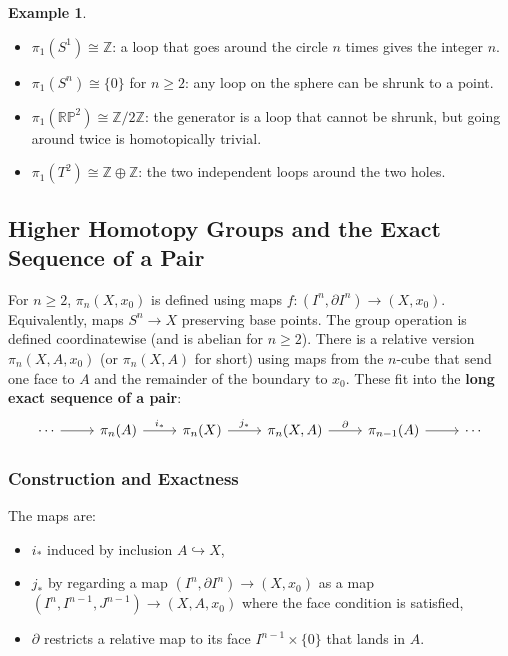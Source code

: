 \documentclass{article}
\theoremstyle{definition}
\newtheorem{example}{Example}[section]
\begin{document}
\begin{example}
\begin{itemize}
    \item $\pi_1(S^1) \cong \mathbb{Z}$: a loop that goes around the circle $n$ times gives the integer $n$.
    \item $\pi_1(S^n) \cong \{0\}$ for $n\ge 2$: any loop on the sphere can be shrunk to a point.
    \item $\pi_1(\mathbb{RP}^2) \cong \mathbb{Z}/2\mathbb{Z}$: the generator is a loop that cannot be shrunk, but going around twice is homotopically trivial.
    \item $\pi_1(T^2) \cong \mathbb{Z}\oplus\mathbb{Z}$: the two independent loops around the two holes.
\end{itemize}
\end{example}

\subsection{Higher Homotopy Groups and the Exact Sequence of a Pair}
For $n\ge 2$, $\pi_n(X,x_0)$ is defined using maps $f:(I^n,\partial I^n)\to (X,x_0)$. Equivalently, maps $S^n\to X$ preserving base points. The group operation is defined coordinatewise (and is abelian for $n\ge2$). There is a relative version $\pi_n(X,A,x_0)$ (or $\pi_n(X,A)$ for short) using maps from the $n$-cube that send one face to $A$ and the remainder of the boundary to $x_0$. These fit into the \textbf{long exact sequence of a pair}:
\[
\begin{tikzcd}
\cdots \arrow[r] & \pi_n(A) \arrow[r, "i_*"] & \pi_n(X) \arrow[r, "j_*"] & \pi_n(X,A) \arrow[r, "\partial"] & \pi_{n-1}(A) \arrow[r] & \cdots
\end{tikzcd}
\]

\subsubsection*{Construction and Exactness}
The maps are:
\begin{itemize}
    \item $i_*$ induced by inclusion $A\hookrightarrow X$,
    \item $j_*$ by regarding a map $(I^n,\partial I^n)\to (X,x_0)$ as a map $(I^n, I^{n-1}, J^{n-1})\to (X,A,x_0)$ where the face condition is satisfied,
    \item $\partial$ restricts a relative map to its face $I^{n-1}\times\{0\}$ that lands in $A$.
\end{itemize}
\end{document}
